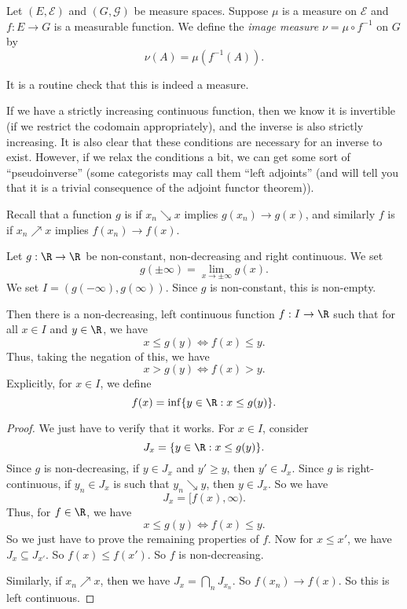 \documentclass[a4paper]{article}
\begin{document}
\begin{defi}
  Let $(E, \mathcal{E})$ and $(G, \mathcal{G})$ be measure spaces. Suppose $\mu$ is a measure on $\mathcal{E}$ and $f: E \to G$ is a measurable function. We define the \emph{image measure} $\nu = \mu \circ f^{-1}$ on $G$ by
  \[
    \nu(A) = \mu(f^{-1}(A)).
  \]
\end{defi}
It is a routine check that this is indeed a measure.

If we have a strictly increasing continuous function, then we know it is invertible (if we restrict the codomain appropriately), and the inverse is also strictly increasing. It is also clear that these conditions are necessary for an inverse to exist. However, if we relax the conditions a bit, we can get some sort of ``pseudoinverse'' (some categorists may call them ``left adjoints'' (and will tell you that it is a trivial consequence of the adjoint functor theorem)).

Recall that a function $g$ is  if $x_n \searrow x$ implies $g(x_n) \to g(x)$, and similarly $f$ is  if $x_n \nearrow x$ implies $f(x_n) \to f(x)$.
\begin{lemma}
  Let $g: \R \to \R$ be non-constant, non-decreasing and right continuous. We set
  \[
    g(\pm \infty) = \lim_{x \to \pm\infty} g(x).
  \]
  We set $I = (g(-\infty), g(\infty))$. Since $g$ is non-constant, this is non-empty.

  Then there is a non-decreasing, left continuous function $f: I \to \R$ such that for all $x \in I$ and $y \in \R$, we have
  \[
    x \leq g(y) \Leftrightarrow f(x) \leq y.
  \]
  Thus, taking the negation of this, we have
  \[
    x > g(y) \Leftrightarrow f(x) > y.
  \]
  Explicitly, for $x \in I$, we define
  \[
    f(x) = \inf\{y \in \R: x \leq g(y)\}.
  \]
\end{lemma}

\begin{proof}
  We just have to verify that it works. For $x \in I$, consider
  \[
    J_x = \{y \in \R: x \leq g(y)\}.
  \]
  Since $g$ is non-decreasing, if $y \in J_x$ and $y' \geq y$, then $y' \in J_x$. Since $g$ is right-continuous, if $y_n \in J_x$ is such that $y_n \searrow y$, then $y \in J_x$. So we have
  \[
    J_x = [f(x), \infty).
  \]
  Thus, for $f \in \R$, we have
  \[
    x \leq g(y) \Leftrightarrow f(x) \leq y.
  \]
  So we just have to prove the remaining properties of $f$. Now for $x \leq x'$, we have $J_x \subseteq J_{x'}$. So $f(x) \leq f(x')$. So $f$ is non-decreasing.

  Similarly, if $x_n \nearrow x$, then we have $J_x = \bigcap_n J_{x_n}$. So $f(x_n) \to f(x)$. So this is left continuous.
\end{proof}
\end{document}
